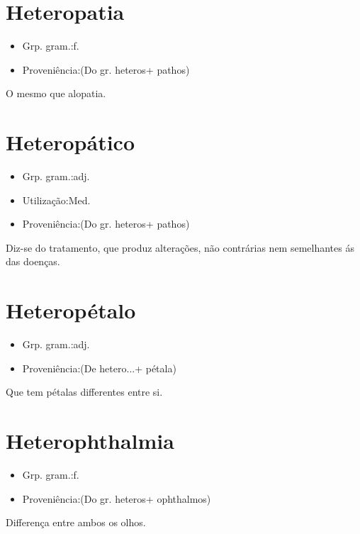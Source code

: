 \documentclass{article}
\begin{document}
\section{Heteropatia}
\begin{itemize}
\item {Grp. gram.:f.}
\end{itemize}
\begin{itemize}
\item {Proveniência:(Do gr. \textunderscore heteros\textunderscore  + \textunderscore pathos\textunderscore )}
\end{itemize}
O mesmo que \textunderscore alopatia\textunderscore .
\section{Heteropático}
\begin{itemize}
\item {Grp. gram.:adj.}
\end{itemize}
\begin{itemize}
\item {Utilização:Med.}
\end{itemize}
\begin{itemize}
\item {Proveniência:(Do gr. \textunderscore heteros\textunderscore  + \textunderscore pathos\textunderscore )}
\end{itemize}
Diz-se do tratamento, que produz alterações, não contrárias nem semelhantes ás das doenças.
\section{Heteropétalo}
\begin{itemize}
\item {Grp. gram.:adj.}
\end{itemize}
\begin{itemize}
\item {Proveniência:(De \textunderscore hetero...\textunderscore  + \textunderscore pétala\textunderscore )}
\end{itemize}
Que tem pétalas differentes entre si.
\section{Heterophthalmia}
\begin{itemize}
\item {Grp. gram.:f.}
\end{itemize}
\begin{itemize}
\item {Proveniência:(Do gr. \textunderscore heteros\textunderscore  + \textunderscore ophthalmos\textunderscore )}
\end{itemize}
Differença entre ambos os olhos.
\end{document}

